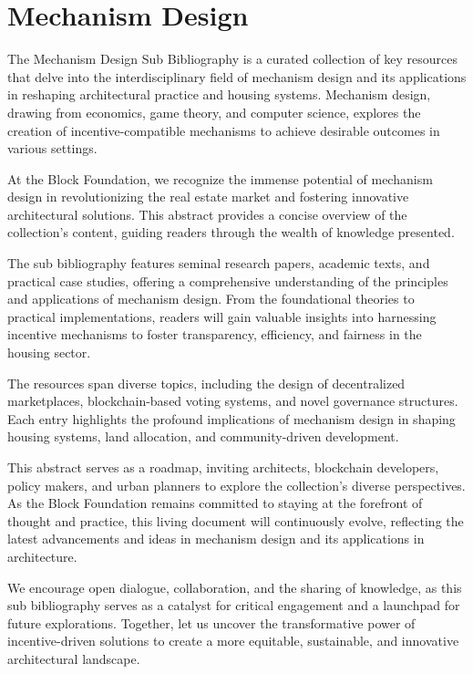 \section{Mechanism Design}

The Mechanism Design Sub Bibliography is a curated collection of key resources that delve into the interdisciplinary field of mechanism design and its applications in reshaping architectural practice and housing systems. Mechanism design, drawing from economics, game theory, and computer science, explores the creation of incentive-compatible mechanisms to achieve desirable outcomes in various settings.

At the Block Foundation, we recognize the immense potential of mechanism design in revolutionizing the real estate market and fostering innovative architectural solutions. This abstract provides a concise overview of the collection's content, guiding readers through the wealth of knowledge presented.

The sub bibliography features seminal research papers, academic texts, and practical case studies, offering a comprehensive understanding of the principles and applications of mechanism design. From the foundational theories to practical implementations, readers will gain valuable insights into harnessing incentive mechanisms to foster transparency, efficiency, and fairness in the housing sector.

The resources span diverse topics, including the design of decentralized marketplaces, blockchain-based voting systems, and novel governance structures. Each entry highlights the profound implications of mechanism design in shaping housing systems, land allocation, and community-driven development.

This abstract serves as a roadmap, inviting architects, blockchain developers, policy makers, and urban planners to explore the collection's diverse perspectives. As the Block Foundation remains committed to staying at the forefront of thought and practice, this living document will continuously evolve, reflecting the latest advancements and ideas in mechanism design and its applications in architecture.

We encourage open dialogue, collaboration, and the sharing of knowledge, as this sub bibliography serves as a catalyst for critical engagement and a launchpad for future explorations. Together, let us uncover the transformative power of incentive-driven solutions to create a more equitable, sustainable, and innovative architectural landscape.




